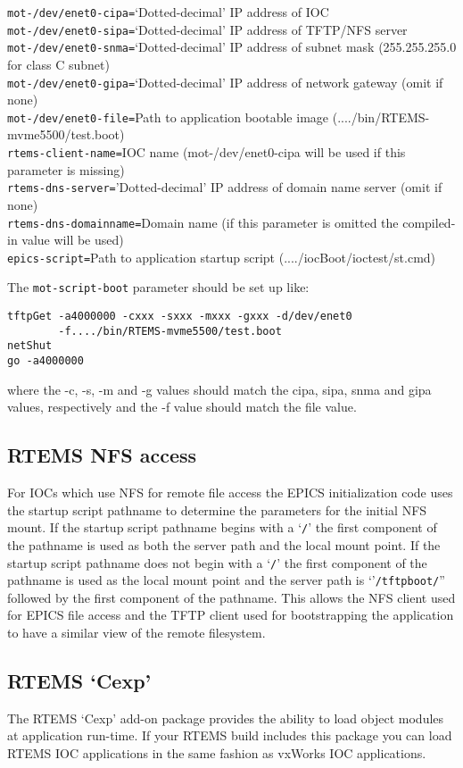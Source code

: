 \noindent
\verb|mot-/dev/enet0-cipa=|`Dotted-decimal' IP address of IOC\\
\verb|mot-/dev/enet0-sipa=|`Dotted-decimal' IP address of TFTP/NFS server\\
\verb|mot-/dev/enet0-snma=|`Dotted-decimal' IP address of subnet mask (255.255.255.0 for class C subnet)\\
\verb|mot-/dev/enet0-gipa=|`Dotted-decimal' IP address of network gateway (omit if none)\\
\verb|mot-/dev/enet0-file=|Path to application bootable image (..../bin/RTEMS-mvme5500/test.boot)\\
\verb|rtems-client-name=|IOC name (mot-/dev/enet0-cipa will be used if this parameter is missing)\\
\verb|rtems-dns-server=|'Dotted-decimal' IP address of domain name server (omit if none)\\
\verb|rtems-dns-domainname=|Domain name (if this parameter is omitted the compiled-in value will be used)\\
\verb|epics-script=|Path to application startup script (..../iocBoot/ioctest/st.cmd)

The \verb|mot-script-boot| parameter should be set up like:

\begin{verbatim}
tftpGet -a4000000 -cxxx -sxxx -mxxx -gxxx -d/dev/enet0
        -f..../bin/RTEMS-mvme5500/test.boot
netShut
go -a4000000
\end{verbatim}
where the -c, -s, -m and -g values should match the cipa, sipa, snma and gipa values, 
respectively and the -f value should match the file value.

\subsection{RTEMS NFS access}

For IOCs which use NFS for remote file access the EPICS initialization code uses the startup script pathname to 
determine the parameters for the initial NFS mount.  If the startup script pathname begins with a `\verb|/|' the first component 
of the pathname is used as both the server path and the local mount point. If the startup script pathname does not begin 
with a `\verb|/|' the first component of the pathname is used as the local mount point and the server path is `'\verb|/tftpboot/|'' 
followed by the first component of the pathname.  This allows the NFS client used for EPICS file access and the TFTP 
client used for bootstrapping the application to have a similar view of the remote filesystem.

\subsection{RTEMS `Cexp'}

The RTEMS `Cexp' add-on package provides the ability to load object modules at application run-time.  If your RTEMS 
build includes this package you can load RTEMS IOC applications in the same fashion as vxWorks IOC applications.




